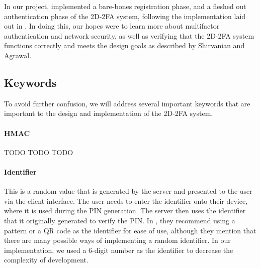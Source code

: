 \documentclass[11pt]{article} %
\begin{document}
In our project, implemented a bare-bones registration phase, and a
fleshed out authentication phase of the 2D-2FA system, following the
implementation laid out in \cite{shirvanian2d2fa}. In doing this, our
hopes were to learn more about multifactor authentication and network
security, as well as verifying that the 2D-2FA system functions
correctly and meets the design goals as described by Shirvanian and
Agrawal. 



\subsection{Keywords}

To avoid further confusion, we will address several important keywords
that are important to the design and implementation of the 2D-2FA
system. 


\paragraph{HMAC} TODO TODO TODO

\paragraph{Identifier} This is a random value that is generated by the
server and presented to the user via the client interface. The user
needs to enter the identifier onto their device, where it is used during
the PIN generation. The server then uses the identifier that it
originally generated to verify the PIN. In \cite{shirvanian2d2fa}, they
recommend using a pattern or a QR code as the identifier for ease of
use, although they mention that there are many possible ways of
implementing a random identifier. In our implementation, we used a
6-digit number as the identifier to decrease the complexity of
development. 
\end{document}

